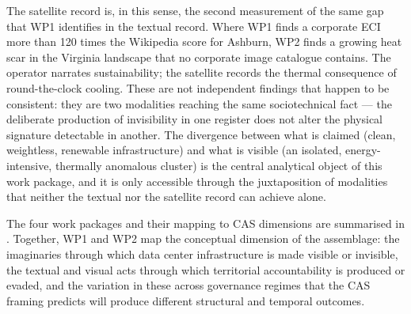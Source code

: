 The satellite record is, in this sense, the second measurement of the same gap that WP1 identifies in the textual record. Where WP1 finds a corporate ECI more than 120 times the Wikipedia score for Ashburn, WP2 finds a growing heat scar in the Virginia landscape that no corporate image catalogue contains. The operator narrates sustainability; the satellite records the thermal consequence of round-the-clock cooling. These are not independent findings that happen to be consistent: they are two modalities reaching the same sociotechnical fact --- the deliberate production of invisibility in one register does not alter the physical signature detectable in another. The divergence between what is claimed (clean, weightless, renewable infrastructure) and what is visible (an isolated, energy-intensive, thermally anomalous cluster) is the central analytical object of this work package, and it is only accessible through the juxtaposition of modalities that neither the textual nor the satellite record can achieve alone.

The four work packages and their mapping to CAS dimensions are summarised in . Together, WP1 and WP2 map the conceptual dimension of the assemblage: the imaginaries through which data center infrastructure is made visible or invisible, the textual and visual acts through which territorial accountability is produced or evaded, and the variation in these across governance regimes that the CAS framing predicts will produce different structural and temporal outcomes.
